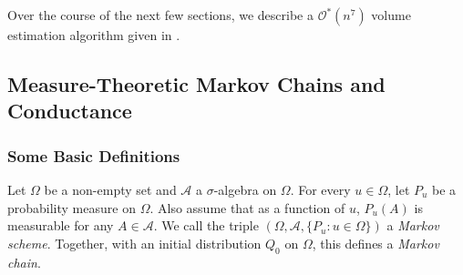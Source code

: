 





Over the course of the next few sections, we describe a $\mathcal{O}^*(n^7)$ volume estimation algorithm given in \cite{lov-sim-on7}.

\subsection{Measure-Theoretic Markov Chains and Conductance}
\label{subsec: measure theoretic markov chains}

\subsubsection{Some Basic Definitions}

\begin{fdef}
Let $\Omega$ be a non-empty set and $\mathcal{A}$ a $\sigma$-algebra on $\Omega$. For every $u\in\Omega$, let $P_u$ be a probability measure on $\Omega$. Also assume that as a function of $u$, $P_u(A)$ is measurable for any $A\in\mathcal{A}$. We call the triple $(\Omega,\mathcal{A},\{P_u:u\in\Omega\})$ a \textit{Markov scheme}. Together, with an initial distribution $Q_0$ on $\Omega$, this defines a \textit{Markov chain}.
\end{fdef}

